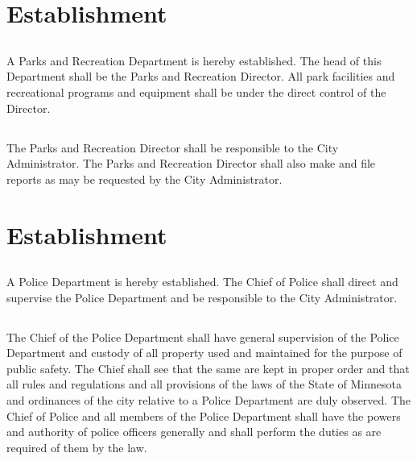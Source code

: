 \setcounter{section}{59}
\section{Establishment}
\subsection{}
A Parks and Recreation Department is hereby established. The head of this Department shall be the Parks and Recreation Director. All park facilities and recreational programs and equipment shall be under the direct control of the Director.
\subsection{}
The Parks and Recreation Director shall be responsible to the City Administrator. The Parks and Recreation Director shall also make and file reports as may be requested by the City Administrator.\\

\setcounter{section}{69}
\section{Establishment}
\subsection{}
A Police Department is hereby established. The Chief of Police shall direct and supervise the Police Department and be responsible to the City Administrator.
\subsection{}
The Chief of the Police Department shall have general supervision of the Police Department and custody of all property used and maintained for the purpose of public safety.  The Chief shall see that the same are kept in proper order and that all rules and regulations and all provisions of the laws of the State of Minnesota and ordinances of the city relative to a Police Department are duly observed. The Chief of Police and all members of the Police Department shall have the powers and authority of police officers generally and shall perform the duties as are required of them by the law.
